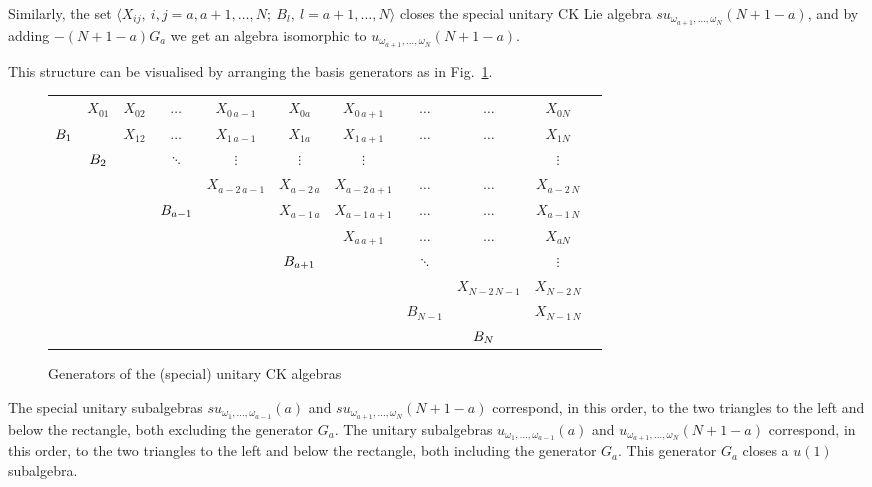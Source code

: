 \documentclass[12pt]{article}
\begin{document}
Similarly, the set $\langle {X}_{ij},\ i,j=a,a+1,\dots,N;\ {B}_l,\
l=a+1,\dots,N \rangle$ closes the  special unitary CK Lie algebra
$su_{{\omega}_{a+1},\dots,{\omega}_N}(N+1-a)$, and by adding $-(N+1-a){G}_a$ we
get an algebra isomorphic to $u_{{\omega}_{a+1},\dots,{\omega}_N}(N+1-a)$.

This structure can be visualised by arranging the basis generators
as in Fig.~\ref{fig2.1}.

\begin{figure}[ht]
\begin{center}
\begin{tabular}{ccccc|cccccc}
& ${X}_{01} $&$ {X}_{02} $&$\ldots$&${X}_{0\, a-1} $&
   ${X}_{0a}$&${X}_{0\, a+1}$&$\ldots$&$\ldots$&${X}_{0N}$\\
$\hfill {B}_{1} $ && $ {X}_{12} $&$\ldots$&${X}_{1\, a-1} $&
   ${X}_{1a}$&${X}_{1\, a+1}$& $\ldots$&$\ldots$&${X}_{1N}$\\
& $\hfill {B}_{2} $ &$  $&$\ddots $&$\vdots$&
   $\vdots$&$\vdots$&$ $&&$\vdots$\\
& &$ $&$ $&${X}_{a-2\,a-1}$&  ${X}_{a-2\,a}$&${X}_{a-2\,a+1}$&
  $\ldots$&$\ldots$&${X}_{a-2\,N}$\\
& &$ $& $\hfill {B}_{a-1}$ &&  ${X}_{a-1\,a}$&${X}_{a-1\,a+1}$&
   $\ldots$&$\ldots$&${X}_{a-1\,N}$\\
\cline{6-10}
& &$ $&\multicolumn{2}{c}{\,} $\hfill {G}_{a}\ \ \ \ $
   &&${X}_{a\,a+1}$& $\ldots$&$\ldots$&${X}_{a  N}$\\
& &$ $&\multicolumn{2}{c}{\,}&  $\hfill {B}_{a+1}$&
  $ $& $\ddots$&&$\vdots$\\
& &$ $&\multicolumn{2}{c}{\,}&  $ $&
  $ $ $  $&&${X}_{N-2\,N-1}$&${X}_{N-2\,N}$\\
& &$ $&\multicolumn{2}{c}{\,}&  $ $&
  $ $ &${B}_{N-1}$&&${X}_{N-1\,N}$\\
& &$ $&\multicolumn{2}{c}{\,}&  $ $& $ $ &&$\hfill {B}_{N}\ \ $\\
\end{tabular}
\end{center}
\caption{Generators of the (special) unitary CK algebras}
\label{fig2.1}
\end{figure}

The special unitary subalgebras $su_{{\omega}_1,\dots,{\omega}_{a-1}}(a)$  and
$su_{{\omega}_{a+1},\dots,{\omega}_N}(N+1-a)$ correspond, in this order, to the
two triangles to the left and below the rectangle, both excluding the
generator ${G}_a$.  The unitary subalgebras
$u_{{\omega}_1,\dots,{\omega}_{a-1}}(a)$  and $u_{{\omega}_{a+1},\dots,{\omega}_N}(N+1-a)$
correspond, in this order, to the two triangles to the left and
below the rectangle, both including the generator ${G}_a$.
This generator ${G}_a$ closes a $u(1)$ subalgebra.
\end{document}
